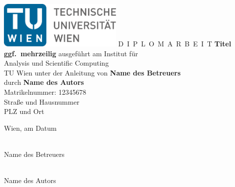 

\begin{titlepage}
  \begin{center}
    \includegraphics[width=0.45\textwidth]{figures/TULogo.pdf}
    \vskip 1cm
      {\LARGE D~\Large I~P~L~O~M~A~R~B~E~I~T}
    \vskip 8mm
      {\huge\bfseries\color{change}Titel \\[1ex] ggf.\ mehrzeilig}
    \vskip 1cm
    \large
    ausgef\"uhrt am
    \vskip 0.75cm
      {\Large Institut f\"ur\\[1ex] Analysis und Scientific Computing}\\[1ex]
    {\Large TU Wien}
    \vskip0.75cm
    unter der Anleitung von
    \vskip0.75cm
    {\Large\bfseries\color{change}Name des Betreuers}\\[1ex]
    \vskip 0.5cm
    durch
    \vskip 0.5cm
      {\Large\bfseries\color{change}Name des Autors}\\[1ex]
    Matrikelnummer: {\color{change}12345678}\\[1ex]
    {\color{change}Straße und Hausnummer}\\[1ex]
    {\color{change}PLZ und Ort}
  \end{center}

  \vfill

  \noindent
  \begin{minipage}[t]{4cm}
    \small Wien, am {\color{change} Datum} %
  \end{minipage}
  \hfill  %
  \begin{minipage}[t]{4cm}
    \centering
    \underline{\hspace*{4cm}}\\
    \small{\color{change}Name des Betreuers}
  \end{minipage}
  \hfill
  \begin{minipage}[t]{4cm}
    \centering
    \underline{\hspace*{4cm}}\\
    \small{\color{change}Name des Autors}
  \end{minipage}
  \vspace*{-15mm}
\end{titlepage}

